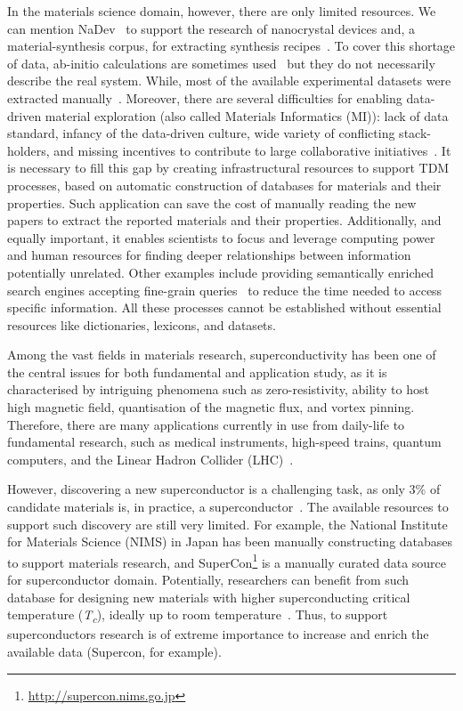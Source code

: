 \documentclass[fleqn,10pt]{wlscirep}
\begin{document}
In the materials science domain, however, there are only limited resources. We can mention NaDev~\cite{Dieb2016} to support the research of nanocrystal devices and, a material-synthesis corpus, for extracting synthesis recipes~\cite{kononova_text-mined_2019}. 
To cover this shortage of data, ab-initio calculations are sometimes used~\cite{Jain2013CommentaryTM_materialsProject} but they do not necessarily describe the real system. While, most of the available experimental datasets were extracted manually~\cite{doi:10.1021/cm400893e}. 
Moreover, there are several difficulties for enabling data-driven material exploration (also called Materials Informatics (MI)): lack of data standard, infancy of the data-driven culture, wide variety of conflicting stack-holders, and missing incentives to contribute to large collaborative initiatives~\cite{Hill2016MaterialsSW}. 
It is necessary to fill this gap by creating infrastructural resources to support TDM processes, based on automatic construction of databases for materials and their properties. 
Such application can save the cost of manually reading the new papers to extract the reported materials and their properties. 
Additionally, and equally important, it enables scientists to focus and leverage computing power and human resources for finding deeper relationships between information potentially unrelated. 
Other examples include providing semantically enriched search engines accepting fine-grain queries~\cite{Liu2019SurfaceMR} to reduce the time needed to access specific information. 
All these processes cannot be established without essential resources like dictionaries, lexicons, and datasets. 

Among the vast fields in materials research, superconductivity has been one of the central issues for both fundamental and application study, as it is characterised by intriguing phenomena such as zero-resistivity, ability to host high magnetic field, quantisation of the magnetic flux, and vortex pinning.  
Therefore, there are many applications currently in use from daily-life to fundamental research, such as medical instruments, high-speed trains, quantum computers, and the Linear Hadron Collider (LHC)~\cite{PhilippeBook, Kizu2010ConstructionOT, Cardani2017NewAO}. 

However, discovering a new superconductor is a challenging task, as only 3\% of candidate materials is, in practice, a superconductor~\cite{Konno2018DeepLO}.
The available resources to support such discovery are still very limited. 
For example, the National Institute for Materials Science (NIMS) in Japan has been manually constructing databases to support materials research, and SuperCon\footnote{\url{http://supercon.nims.go.jp}} is a manually curated data source for superconductor domain. 
Potentially, researchers can benefit from such database for designing new materials with higher superconducting critical temperature (\textit{T\textsubscript{c}}), ideally up to room temperature~\cite{Hamlin2019SuperconductivityNR,stanev2017machine}. 
Thus, to support superconductors research is of extreme importance to increase and enrich the available data (Supercon, for example).
\end{document}
